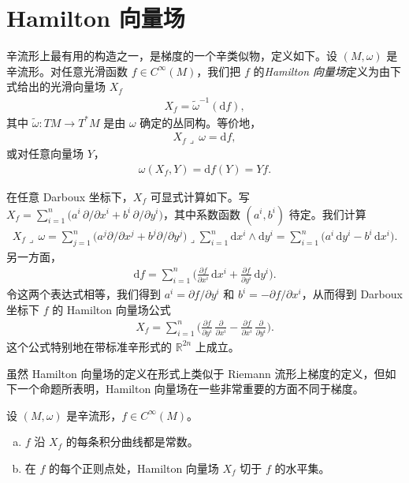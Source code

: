 \documentclass[../../main.tex]{subfiles}
\begin{document}
\section{Hamilton 向量场}\label{section:ch22-hamiltonian-vector-fields}

辛流形上最有用的构造之一，是梯度的一个辛类似物，定义如下。设 $(M,\omega)$ 是辛流形。对任意光滑函数 $f\in C^\infty(M)$，我们把 $f$ 的\emph{Hamilton 向量场}定义为由下式给出的光滑向量场 $X_f$
\begin{align*}
X_f=\widetilde\omega^{-1}(\mathrm{d}f),
\end{align*}
其中 $\widetilde\omega:TM\to T^*M$ 是由 $\omega$ 确定的丛同构。等价地，
\begin{align*}
X_f\lrcorner\,\omega=\mathrm{d}f,
\end{align*}
或对任意向量场 $Y$，
\begin{align*}
\omega(X_f,Y)=\mathrm{d}f(Y)=Yf.
\end{align*}

在任意 Darboux 坐标下，$X_f$ 可显式计算如下。写 $X_f=\sum_{i=1}^n\big(a^i\,\partial/\partial x^i+b^i\,\partial/\partial y^i\big)$，其中系数函数 $(a^i,b^i)$ 待定。我们计算
\begin{align*}
X_f\lrcorner\,\omega
=\sum_{j=1}^n\big(a^j\partial/\partial x^j+b^j\partial/\partial y^j\big)\lrcorner\sum_{i=1}^n\mathrm{d}x^i\wedge\mathrm{d}y^i
=\sum_{i=1}^n\big(a^i\,\mathrm{d}y^i-b^i\,\mathrm{d}x^i\big).
\end{align*}
另一方面，
\begin{align*}
\mathrm{d}f=\sum_{i=1}^n\big(\tfrac{\partial f}{\partial x^i}\,\mathrm{d}x^i+\tfrac{\partial f}{\partial y^i}\,\mathrm{d}y^i\big).
\end{align*}
令这两个表达式相等，我们得到 $a^i=\partial f/\partial y^i$ 和 $b^i=-\partial f/\partial x^i$，从而得到 Darboux 坐标下 $f$ 的 Hamilton 向量场公式
\begin{align}
X_f=\sum_{i=1}^n\big(\tfrac{\partial f}{\partial y^i}\,\tfrac{\partial}{\partial x^i}
-\tfrac{\partial f}{\partial x^i}\,\tfrac{\partial}{\partial y^i}\big).
\end{align}
这个公式特别地在带标准辛形式的 $\mathbb{R}^{2n}$ 上成立。

虽然 Hamilton 向量场的定义在形式上类似于 Riemann 流形上梯度的定义，但如下一个命题所表明，Hamilton 向量场在一些非常重要的方面不同于梯度。

\begin{proposition}\label{proposition:ch22-hamiltonian-properties}
设 $(M,\omega)$ 是辛流形，$f\in C^\infty(M)$。
\begin{enumerate}[(a)]
\item $f$ 沿 $X_f$ 的每条积分曲线都是常数。
\item 在 $f$ 的每个正则点处，Hamilton 向量场 $X_f$ 切于 $f$ 的水平集。
\end{enumerate}
\end{proposition}
\end{document}
